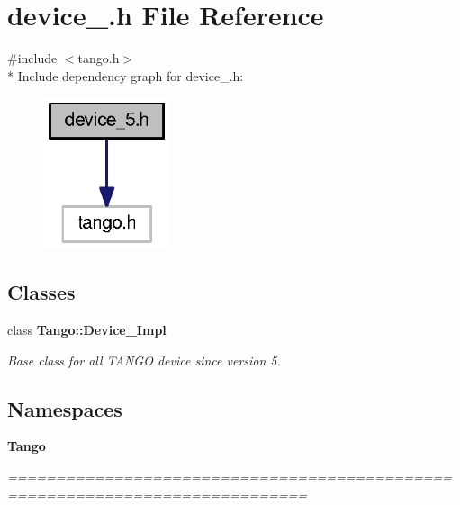 \section{device\-\_.\-h File Reference}
\label{device__5_8h}
{\ttfamily \#include $<$tango.\-h$>$}\\*
Include dependency graph for device\-\_.\-h\-:
\nopagebreak
\begin{figure}[H]
\begin{center}
\leavevmode
\includegraphics[width=106pt]{dc/d2a/device__5_8h__incl}
\end{center}
\end{figure}
\subsection*{Classes}
\begin{DoxyCompactItemize}
\item 
class {\bf Tango\-::\-Device\-\_\-Impl}
\begin{DoxyCompactList}\small\item\em Base class for all T\-A\-N\-G\-O device since version 5. \end{DoxyCompactList}\end{DoxyCompactItemize}
\subsection*{Namespaces}
\begin{DoxyCompactItemize}
\item 
{\bf Tango}
\begin{DoxyCompactList}\small\item\em ============================================================================= \end{DoxyCompactList}\end{DoxyCompactItemize}
